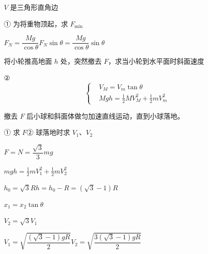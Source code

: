 \begin{keybox}[几何关联]%
$V$ 是三角形直角边
\end{keybox}
\begin{problem}[{[1]}]
① 为将重物顶起，求 $F_{\min}$

\noindent $F_N=\dfrac{Mg}{\cos\theta}$\qquad $F_N\sin\theta=\dfrac{Mg}{\cos\theta}\sin\theta$

\noindent 将小轮推高地面 $h$ 处，突然撤去 $F$，求当小轮到水平面时斜面速度

\noindent ②
\[
\left\{\begin{aligned}
&V_M=V_m\tan\theta\\
&Mgh=\tfrac12MV_M^{2}+\tfrac12mV_m^{2}
\end{aligned}\right.
\]
\end{problem}
\begin{problem}[{[2]}]
撤去 $F$ 后小球和斜面体做匀加速直线运动，直到小球落地。

\noindent ① 求 $F$\quad ② 球落地时求 $V_1$、$V_2$

\noindent $F=N=\dfrac{\sqrt3}{3}mg$

\noindent $mgh=\tfrac12mV_1^{2}+\tfrac12mV_2^{2}$

\noindent $h_0=\sqrt3R$\quad $h=h_0-R=(\sqrt3-1)R$

\noindent $x_1=x_2\tan\theta$

\noindent $V_2=\sqrt3V_1$

\noindent $V_1=\sqrt{\dfrac{(\sqrt3-1)gR}{2}}$\quad $V_2=\sqrt{\dfrac{3(\sqrt3-1)gR}{2}}$
\end{problem}
